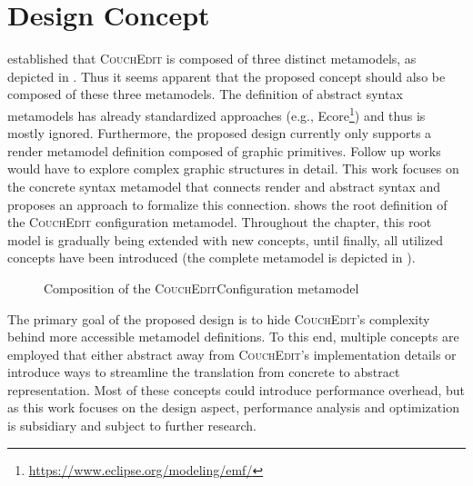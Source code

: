 \chapter{Design Concept}
\label{ch:design}
 established that \textsc{CouchEdit} is composed of three distinct metamodels,  as depicted in . Thus it seems apparent that the proposed concept should also be composed of these three metamodels. The definition of abstract syntax metamodels has already standardized approaches (e.g., Ecore\footnote{\url{https://www.eclipse.org/modeling/emf/}}) and thus is mostly ignored. Furthermore, the proposed design currently only supports a render metamodel definition composed of graphic primitives. Follow up works would have to explore complex graphic structures in detail.  This work focuses on the concrete syntax metamodel that connects render and abstract syntax and proposes an approach to formalize this connection.  shows the root definition of the \textsc{CouchEdit} configuration metamodel. Throughout the chapter, this root model is gradually being extended with new concepts, until finally, all utilized concepts have been introduced (the complete metamodel is depicted in ).

\begin{figure}[h]
  \centering
  
  \caption{Composition of the \textsc{CouchEdit}Configuration metamodel}
  \label{fig:metamodel-base}
\end{figure}

The primary goal of the proposed design is to hide \textsc{CouchEdit}'s complexity behind more accessible metamodel definitions. To this end, multiple concepts are employed that either abstract away from \textsc{CouchEdit}'s implementation details or introduce ways to streamline the translation from concrete to abstract representation. Most of these concepts could introduce performance overhead, but as this work focuses on the design aspect, performance analysis and optimization is subsidiary and subject to further research.

